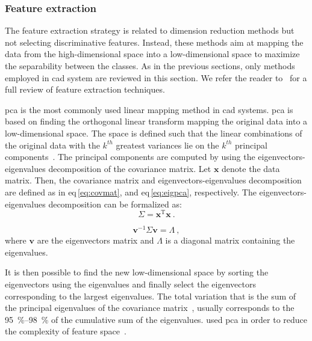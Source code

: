 \subsubsection{Feature extraction}\label{subsubsec:chp3:img-clas:CADX:fea-ext:ext}
The feature extraction strategy is related to dimension reduction methods but not selecting discriminative features.
Instead, these methods aim at mapping the data from the high-dimensional space into a low-dimensional space to maximize the separability between the classes.
As in the previous sections, only methods employed in \ac{cad} system are reviewed in this section.
We refer the reader to~\cite{Fodor2002} for a full review of feature extraction techniques.

\ac{pca} is the most commonly used linear mapping method in \ac{cad} systems.
\ac{pca} is based on finding the orthogonal linear transform mapping the original data into a low-dimensional space.
The space is defined such that the linear combinations of the original data with the $k^{th}$ greatest variances lie on the $k^{th}$ principal components~\cite{Jolliffe2002}.
The principal components are computed by using the eigenvectors-eigenvalues decomposition of the covariance matrix.
Let $\mathbf{x}$ denote the data matrix.
Then, the covariance matrix and eigenvectors-eigenvalues decomposition are defined as in \acs{eq}\,\eqref{eq:covmat}, and \acs{eq}\,\eqref{eq:eigpca}, respectively. 
The eigenvectors-eigenvalues decomposition can be formalized as:
\begin{equation}
  \Sigma = \mathbf{x}^{\text{T}} \mathbf{x} \ .
  \label{eq:covmat}
\end{equation}

\begin{equation}
  \mathbf{v}^{-1} \Sigma \mathbf{v} = \Lambda \ ,
  \label{eq:eigpca}
\end{equation}
\noindent where $\mathbf{v}$ are the eigenvectors matrix and $\Lambda$ is a diagonal matrix containing the eigenvalues. 

It is then possible to find the new low-dimensional space by sorting the eigenvectors using the eigenvalues and finally select the eigenvectors corresponding to the largest eigenvalues.
The total variation that is the sum of the principal eigenvalues of the covariance matrix~\cite{Fodor2002}, usually corresponds to the \SIrange{95}{98}{\percent} of the cumulative sum of the eigenvalues.
\citeauthor{Tiwari2012} used \ac{pca} in order to reduce the complexity of feature space~\cite{Tiwari2008,Tiwari2009,Tiwari2012}.

